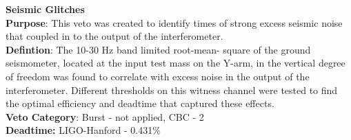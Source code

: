 \textbf{Seismic Glitches} \\
\textbf{Purpose}: This veto was created to identify times of strong excess
seismic noise that coupled in to the output of the interferometer.\\
\textbf{Defintion}: The 10-30 Hz band limited root-mean-
square of the ground seismometer, located at the input test mass on the Y-arm, in the vertical degree of freedom was found to correlate with excess noise in
the output of the interferometer. Different thresholds on this witness channel
were tested to find the optimal efficiency and deadtime that captured these
effects.\\
\textbf{Veto Category}: Burst - not applied, CBC - 2\\
\textbf{Deadtime:} LIGO-Hanford - 0.431\%


